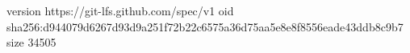 version https://git-lfs.github.com/spec/v1
oid sha256:d944079d6267d93d9a251f72b22c6575a36d75aa5e8e8f8556eade43ddb8c9b7
size 34505

